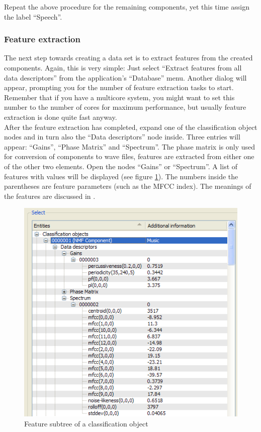 Repeat the above procedure for the remaining components, yet this time assign
the label ``Speech''.


\subsubsection{Feature extraction}

The next step towards creating a data set is to extract features from the
created components. Again, this is very simple: Just select ``Extract features
from all data descriptors'' from the application's ``Database'' menu. Another
dialog will appear, prompting you for the number of feature extraction tasks to
start.  Remember that if you have a multicore system, you might want to set this
number to the number of cores for maximum performance, but usually feature
extraction is done quite fast anyway.\\

After the feature extraction has completed, expand one of the classification
object nodes and in turn also the ``Data descriptors'' node inside. Three
entries will appear: ``Gains'', ``Phase Matrix'' and ``Spectrum''. The phase
matrix is only used for conversion of components to wave files, features are
extracted from either one of the other two elements. Open the nodes ``Gains'' or
``Spectrum''. A list of features with values will be displayed (see figure
\ref{figure:TutorialFeatureSubtree}). The numbers inside the parentheses are
feature parameters (such as the MFCC index). The meanings of the features are
discussed in \cite{SchullerLehmannWeninger}.

\begin{figure}
    \centering
    \includegraphics[width=.8\textwidth]{tutorial-media/FeatureSubtree.png}
    \caption{%
        \label{figure:TutorialFeatureSubtree}%
        Feature subtree of a classification object
    }
\end{figure}


